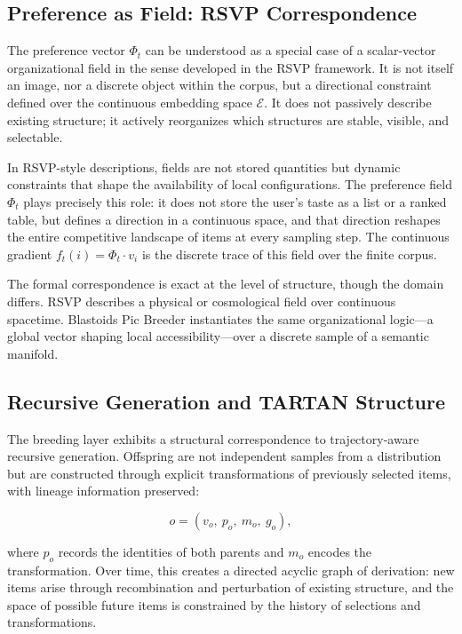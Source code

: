 \documentclass[12pt, a4paper]{article}
\theoremstyle{definition}
\begin{document}
\subsection{Preference as Field: RSVP Correspondence}

The preference vector $\Phi_t$ can be understood as a special case of a scalar-vector organizational field in the sense developed in the RSVP framework. It is not itself an image, nor a discrete object within the corpus, but a directional constraint defined over the continuous embedding space $\mathcal{E}$. It does not passively describe existing structure; it actively reorganizes which structures are stable, visible, and selectable.

In RSVP-style descriptions, fields are not stored quantities but dynamic constraints that shape the availability of local configurations. The preference field $\Phi_t$ plays precisely this role: it does not store the user's taste as a list or a ranked table, but defines a direction in a continuous space, and that direction reshapes the entire competitive landscape of items at every sampling step. The continuous gradient $f_t(i) = \Phi_t \cdot v_i$ is the discrete trace of this field over the finite corpus.

The formal correspondence is exact at the level of structure, though the domain differs. RSVP describes a physical or cosmological field over continuous spacetime. Blastoids Pic Breeder instantiates the same organizational logic---a global vector shaping local accessibility---over a discrete sample of a semantic manifold.

\subsection{Recursive Generation and TARTAN Structure}

The breeding layer exhibits a structural correspondence to trajectory-aware recursive generation. Offspring are not independent samples from a distribution but are constructed through explicit transformations of previously selected items, with lineage information preserved:

\begin{equation}
o = (v_o,\ p_o,\ m_o,\ g_o),
\end{equation}

where $p_o$ records the identities of both parents and $m_o$ encodes the transformation. Over time, this creates a directed acyclic graph of derivation: new items arise through recombination and perturbation of existing structure, and the space of possible future items is constrained by the history of selections and transformations.
\end{document}
